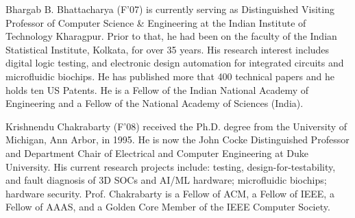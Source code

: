 \documentclass[journal,twoside]{IEEEtran}
\begin{document}
\vskip -27.7pt
\begin{IEEEbiography}
{Bhargab B. Bhattacharya} (F'07) is currently serving as Distinguished Visiting
Professor of Computer Science \& Engineering at the Indian Institute of
Technology Kharagpur. Prior to that, he had been on the faculty of the Indian
Statistical Institute, Kolkata, for over 35 years. His research interest
includes digital logic testing, and electronic design automation for integrated
circuits and microfluidic biochips. He has published more that 400 technical
papers and he holds ten US Patents. He is a Fellow of the Indian National
Academy of Engineering and a Fellow of the National Academy of Sciences
(India).
\end{IEEEbiography}
\vskip -27.7pt
\begin{IEEEbiography}
{Krishnendu Chakrabarty} (F'08) received the Ph.D. degree from the University of Michigan, Ann Arbor, in 1995. He is now the John Cocke Distinguished Professor and Department Chair of Electrical and Computer Engineering at Duke University. His current research projects include: testing, design-for-testability, and fault diagnosis of 3D SOCs and AI/ML hardware; microfluidic biochips; hardware security. Prof. Chakrabarty is a Fellow of ACM, a Fellow of IEEE, a Fellow of AAAS, and a Golden Core Member of the IEEE Computer Society. 
\end{IEEEbiography}
\vskip -27.7pt
\end{document}
